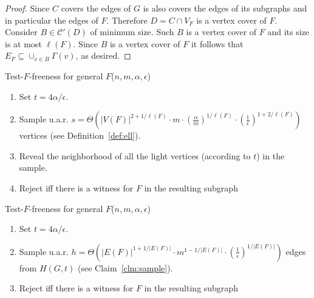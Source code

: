 \begin{proof}
Since $C$ covers the edges of $G$ is also covers the edges of its subgraphs and in particular the edges of $F$. Therefore $D = C\cap V_F$ is a vertex cover of $F$. Consider $B\in \mathcal{C'}(D)$ of minimum size. Such $B$ is a vertex cover of $F$ and its size is at most $\ell(F)$.
Since $B$ is a vertex cover of $F$ it follows that $E_F \subseteq \cup_{v\in B} \Gamma(v)$, as desired.  
\end{proof}






\medskip
    \textsf{Test-$F$-freeness for general $F$}($n, m, \alpha, \epsilon$)  
\begin{enumerate}
\item Set $t = 4\alpha/\epsilon$.
\item Sample u.a.r. $s = $$\Theta\left(|V(F)|^{2+1/\ell(F)} \cdot m \cdot \left(\frac{\alpha}{m }\right)^{1/\ell(F)} \cdot \left(\frac{1}{\epsilon}\right)^{1+2/\ell(F)}\right)$ vertices (see Definition~\ref{def:ell}).
\item Reveal the neighborhood of all the light vertices (according to $t$) in the sample. 
\item Reject iff there is a witness for $F$ in the resulting subgraph
\end{enumerate}

\medskip
    \textsf{Test-$F$-freeness for general $F$}($n, m, \alpha, \epsilon$)
\begin{enumerate}
\item Set $t = 4\alpha/\epsilon$.
\item Sample u.a.r. $h = \Theta\left(|E(F)|^{1+1/|E(F)|} \cdot m^{1-1/|E(F)|} \cdot \left(\frac{1}{\epsilon}\right)^{1/|E(F)|}\right)$ edges from $H(G, t)$ (see Claim~\ref{clm:sample}).
\item Reject iff there is a witness for $F$ in the resulting subgraph
\end{enumerate}


